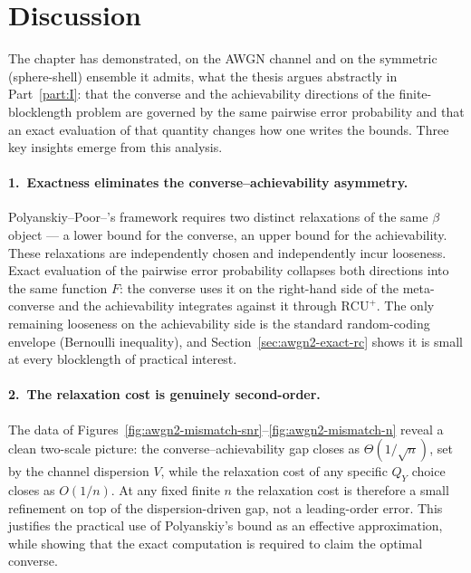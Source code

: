 \section{Discussion}
\label{sec:awgn2-discussion}

The chapter has demonstrated, on the AWGN channel and on the symmetric (sphere-shell) ensemble it admits, what the thesis argues abstractly in Part~\ref{part:I}: that the converse and the achievability directions of the finite-blocklength problem are governed by the same pairwise error probability and that an exact evaluation of that quantity changes how one writes the bounds.  Three key insights emerge from this analysis.

\paragraph{1.\ Exactness eliminates the converse--achievability asymmetry.}
Polyanskiy--Poor--\verdu's framework requires two distinct relaxations of the same $\beta$ object --- a lower bound for the converse, an upper bound for the achievability.  These relaxations are independently chosen and independently incur looseness.  Exact evaluation of the pairwise error probability collapses both directions into the same function $F$: the converse uses it on the right-hand side of the meta-converse and the achievability integrates against it through $\mathrm{RCU}^+$.  The only remaining looseness on the achievability side is the standard random-coding envelope (Bernoulli inequality), and Section~\ref{sec:awgn2-exact-rc} shows it is small at every blocklength of practical interest.

\paragraph{2.\ The relaxation cost is genuinely second-order.}
The data of Figures~\ref{fig:awgn2-mismatch-snr}--\ref{fig:awgn2-mismatch-n} reveal a clean two-scale picture: the converse--achievability gap closes as $\Theta(1/\sqrt{n})$, set by the channel dispersion $V$, while the relaxation cost of any specific $Q_Y$ choice closes as $O(1/n)$.  At any fixed finite $n$ the relaxation cost is therefore a small refinement on top of the dispersion-driven gap, not a leading-order error.  This justifies the practical use of Polyanskiy's bound as an effective approximation, while showing that the exact computation is required to claim the optimal converse.

